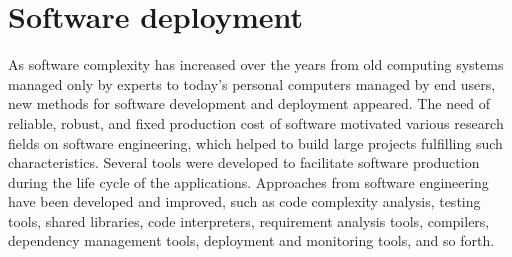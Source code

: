 \section{Software deployment}
\label{sec:softDeployment}
As software complexity has increased over the years from old computing systems managed only by experts to today's personal computers managed by end users, new methods for software development and deployment appeared.
The need of reliable, robust, and fixed production cost of software motivated various research fields on software engineering, which helped to build large projects fulfilling such characteristics.
Several tools were developed to facilitate software production during the life cycle of the applications.
Approaches from software engineering have been developed and improved, such as code complexity analysis, testing tools, shared libraries, code interpreters, requirement analysis tools, compilers, dependency management tools, deployment and monitoring tools, and so forth.

